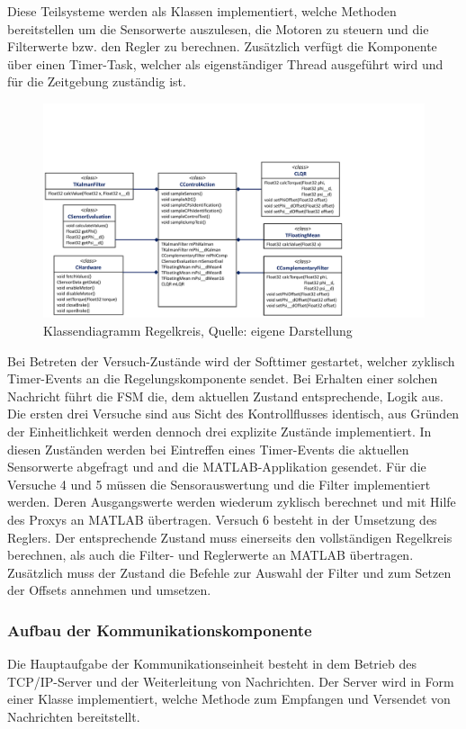 Diese Teilsysteme werden als Klassen implementiert, welche Methoden bereitstellen um die Sensorwerte auszulesen, die Motoren zu steuern und die Filterwerte bzw. den Regler zu berechnen. Zusätzlich verfügt die Komponente über einen Timer-Task, welcher als eigenständiger Thread ausgeführt wird und für die Zeitgebung zuständig ist. 

\begin{figure}[!h]
\centering
\includegraphics[width=\linewidth, trim={0cm 0cm 7cm 5cm}, clip]{img/SW_KontrollKlassen}
\caption{Klassendiagramm Regelkreis, Quelle: eigene Darstellung}
\end{figure}

Bei Betreten der Versuch-Zustände wird der Softtimer gestartet, welcher zyklisch Timer-Events an die Regelungskomponente sendet. Bei Erhalten einer solchen Nachricht führt die FSM die, dem aktuellen Zustand entsprechende, Logik aus. 
Die ersten drei Versuche sind aus Sicht des Kontrollflusses identisch, aus Gründen der Einheitlichkeit werden dennoch drei explizite Zustände implementiert. In diesen Zuständen werden bei Eintreffen eines Timer-Events die aktuellen Sensorwerte abgefragt und and die MATLAB-Applikation gesendet. Für die Versuche 4 und 5 müssen die Sensorauswertung und die Filter implementiert werden. Deren Ausgangswerte werden wiederum zyklisch berechnet und mit Hilfe des Proxys an MATLAB übertragen. Versuch 6 besteht in der Umsetzung des Reglers. Der entsprechende Zustand muss einerseits den vollständigen Regelkreis berechnen, als auch die Filter- und Reglerwerte an MATLAB übertragen. Zusätzlich muss der Zustand die Befehle zur Auswahl der Filter und zum Setzen der Offsets annehmen und umsetzen.

\subsubsection{Aufbau der Kommunikationskomponente}
Die Hauptaufgabe der Kommunikationseinheit besteht in dem Betrieb des TCP/IP-Server und der Weiterleitung von Nachrichten. Der Server wird in Form einer Klasse implementiert, welche Methode zum Empfangen und Versendet von Nachrichten bereitstellt. 

